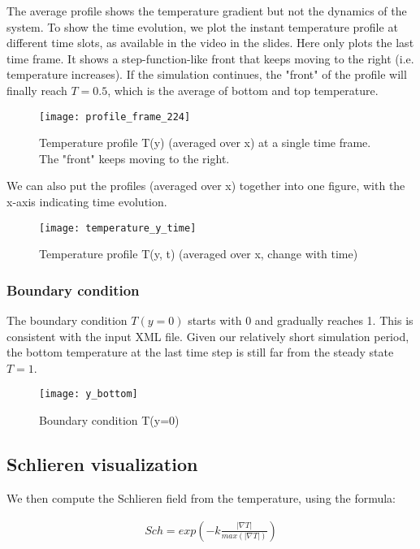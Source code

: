 The average profile shows the temperature gradient but not the dynamics of the system. To show the time evolution, we plot the instant temperature profile at different time slots, as available in the video in the slides. Here only plots the last time frame. It shows a step-function-like front that keeps moving to the right (i.e. temperature increases). If the simulation continues, the "front" of the profile will finally reach $T=0.5$, which is the average of bottom and top temperature.

\begin{figure}[H]
\texttt{[image: profile\_frame\_224]}
\centering
\caption{Temperature profile T(y) (averaged over x) at a single time frame. The "front" keeps moving to the right.}
\end{figure}

We can also put the profiles (averaged over x) together into one figure, with the x-axis indicating time evolution. 

\begin{figure}[H]
\texttt{[image: temperature\_y\_time]}
\centering
\caption{Temperature profile T(y, t) (averaged over x, change with time)}
\end{figure}

\subsubsection{Boundary condition}

The boundary condition $T(y=0)$ starts with 0 and gradually reaches 1. This is consistent with the input XML file. Given our relatively short simulation period, the bottom temperature at the last time step is still far from the steady state $T=1$.

\begin{figure}[H]
\texttt{[image: y\_bottom]}
\centering
\caption{Boundary condition T(y=0)}
\end{figure}

\subsection{Schlieren visualization}

We then compute the Schlieren field from the temperature, using the formula:

\begin{align}
Sch = exp(-k\frac{|\nabla T|}{max(|\nabla T|)})
\end{align}

